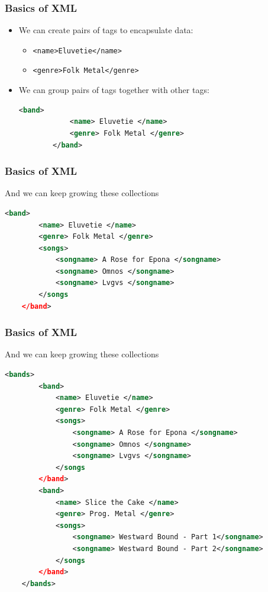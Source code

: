 \documentclass{beamer}
\begin{document}
\begin{frame}[fragile]
    \frametitle{Basics of XML}
    \begin{itemize}
        \item We can create pairs of tags to encapsulate data:
            \begin{itemize}
                \item \lstinline|<name>Eluvetie</name>|
                \item \lstinline|<genre>Folk Metal</genre>|
            \end{itemize}
        \item We can group pairs of tags together with other tags:
        \begin{lstlisting}[basicstyle=\scriptsize, language=XML]
        <band>
            <name> Eluvetie </name>
            <genre> Folk Metal </genre>
        </band>
        \end{lstlisting}
    \end{itemize}
\end{frame}

\begin{frame}[fragile]
    \frametitle{Basics of XML}
    And we can keep growing these collections
    \begin{lstlisting}[basicstyle=\scriptsize, language=XML]
    <band>
        <name> Eluvetie </name>
        <genre> Folk Metal </genre>
        <songs>
            <songname> A Rose for Epona </songname>
            <songname> Omnos </songname>
            <songname> Lvgvs </songname>
        </songs
    </band>
    \end{lstlisting}
\end{frame}

\begin{frame}[fragile]
    \frametitle{Basics of XML}
    And we can keep growing these collections
    \begin{lstlisting}[basicstyle=\scriptsize, language=XML]
    <bands>
        <band>
            <name> Eluvetie </name>
            <genre> Folk Metal </genre>
            <songs>
                <songname> A Rose for Epona </songname>
                <songname> Omnos </songname>
                <songname> Lvgvs </songname>
            </songs
        </band>
        <band>
            <name> Slice the Cake </name>
            <genre> Prog. Metal </genre>
            <songs>
                <songname> Westward Bound - Part 1</songname>
                <songname> Westward Bound - Part 2</songname>
            </songs
        </band>
    </bands>
    \end{lstlisting}
\end{frame}
\end{document}
